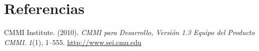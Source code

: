 \section{Referencias}\label{sec:referencias}

CMMI Institute. (2010). \emph{CMMI \textregistered{} para Desarrollo, Versión 1.3 Equipo
del Producto CMMI}. \emph{1}(1), 1--555. \url{http://www.sei.cmu.edu}
